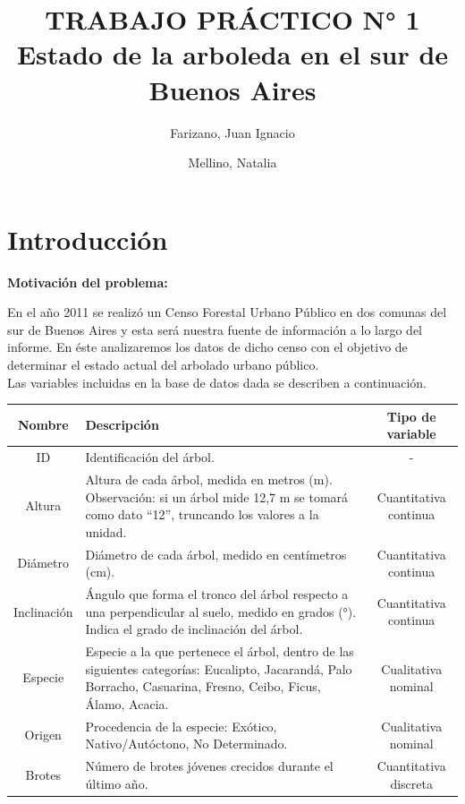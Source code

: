 \documentclass[11pt]{article}
\title{
  TRABAJO PRÁCTICO N° 1\\
  \large Estado de la arboleda en el sur de Buenos Aires
}
\author{
  Farizano, Juan Ignacio\\
  \and
  Mellino, Natalia
}
\date{}
\begin{document}
\maketitle
\newpage

\tableofcontents
\newpage


\section{Introducción}
\textbf{Motivación del problema:}

\begin{justify}
  En el año 2011 se realizó un Censo Forestal Urbano Público en dos
  comunas del sur de Buenos Aires y esta será nuestra fuente de información
  a lo largo del informe.
  En éste analizaremos los datos de dicho censo con el objetivo
  de determinar el estado actual del arbolado urbano público.\\
  Las variables incluidas en la base de datos dada se describen a continuación.
\end{justify}

\begin{center}
  \begin{tabular}{| c | p{9cm} | c |}
    \hline
    \textbf{Nombre} & \textbf{Descripción} & \textbf{Tipo de variable} \\ \hline
    ID & Identificación del árbol. & - \\ \hline
    Altura & Altura de cada árbol, medida en metros (m). Observación: si un árbol
    mide 12,7 m se tomará como dato “12”, truncando los valores a la unidad. & 
    Cuantitativa continua \\ \hline
    Diámetro & Diámetro de cada árbol, medido en centímetros (cm). & 
    Cuantitativa continua \\ \hline
    Inclinación & Ángulo que forma el tronco del árbol respecto
    a una perpendicular al suelo, medido en grados (°).
    Indica el grado de inclinación del árbol. & Cuantitativa continua \\ \hline
    Especie & Especie a la que pertenece el árbol, dentro de las siguientes
    categorías: Eucalipto, Jacarandá, Palo Borracho, Casuarina, Fresno, Ceibo,
    Ficus, Álamo, Acacia. & Cualitativa nominal \\ \hline
    Origen & Procedencia de la especie: Exótico, Nativo/Autóctono, 
    No Determinado. & Cualitativa nominal \\ \hline
    Brotes & Número de brotes jóvenes crecidos durante el último año. &
    Cuantitativa discreta \\ \hline
  \end{tabular}
\end{center}
\end{document}
